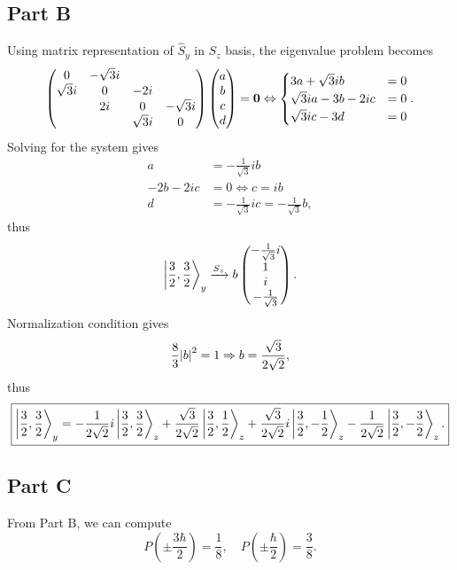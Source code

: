 \documentclass{article}
\begin{document}
\subsection*{Part B}
Using matrix representation of $\hat{S}_y$ in $S_z$ basis, the eigenvalue problem becomes
\[
    \pmqty{0 & -\sqrt{3}i &  &  \\ \sqrt{3}i & 0 & -2i &  \\  & 2i & 0 & -\sqrt{3}i \\  &  & \sqrt{3}i & 0}
    \pmqty{a\\b\\c\\d} = \vb{0}
    \Leftrightarrow
    \begin{cases}
        3a+\sqrt{3}ib&=0 \\
        \sqrt{3}ia-3b-2ic&=0 \\
        \sqrt{3}ic-3d&=0
    \end{cases}
    .
\]
Solving for the system gives
\begin{align*}
    a&=-\frac{1}{\sqrt{3}}ib \\
    -2b-2ic&=0 \Leftrightarrow c=ib \\
    d&=-\frac{1}{\sqrt{3}}ic =-\frac{1}{\sqrt{3}}b,
\end{align*}
thus 
\[
    \ket{\frac{3}{2}, \frac{3}{2}}_y
    \xrightarrow{S_z}
    b\pmqty{-\frac{1}{\sqrt{3}}i \\ 1\\i\\ -\frac{1}{\sqrt{3}}}.
\]
Normalization condition gives 
\[
    \frac{8}{3}\abs{b}^2 =1 \Rightarrow
    b=\frac{\sqrt{3}}{2\sqrt{2}},
\]
thus
\[
    \boxed{
    \ket{\frac{3}{2}, \frac{3}{2}}_y
    =-\frac{1}{2\sqrt{2}}i\ket{\frac{3}{2}, \frac{3}{2}}_z + 
    \frac{\sqrt{3}}{2\sqrt{2}}\ket{\frac{3}{2}, \frac{1}{2}}_z
    +\frac{\sqrt{3}}{2\sqrt{2}}i\ket{\frac{3}{2}, -\frac{1}{2}}_z
    -\frac{1}{2\sqrt{2}}\ket{\frac{3}{2}, -\frac{3}{2}}_z.}
\]
\subsection*{Part C}
From Part B, we can compute
\[
    P(\pm \frac{3\hbar}{2}) = \frac{1}{8}, \quad
    P(\pm \frac{\hbar}{2}) = \frac{3}{8}.
\]
\end{document}
